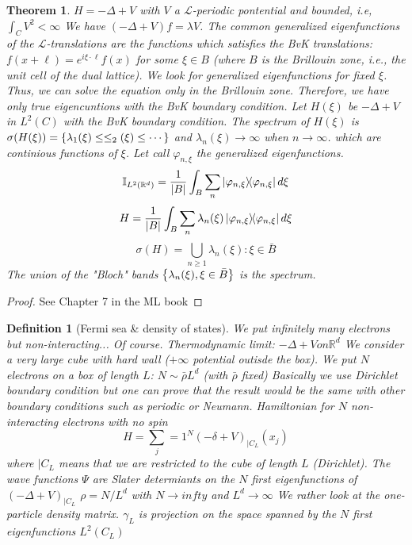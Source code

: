 \documentclass{article}
\newtheorem*{theorem}{Theorem}
\newtheorem*{definition}{Definition}
\newcommand{\RR}{\mathbb{R}}
\newcommand{\II}{\mathbb{I}}
\newcommand{\cL}{\mathcal{L}}
\newcommand{\sig}{\sigma}
\newcommand{\la}{\lambda}
\begin{document}
\begin{theorem} 
    $H = -\Delta +  V$ with $V$ a $\cL$-periodic pontential and bounded, i.e, $\int_C V^2 < \infty$
    We have $(-\Delta +  V) f = \la V$.
    The common generalized eigenfunctions of the $\cL$-translations are the functions which satisfies the BvK translations: 
    $f(x+\ell) = e^{i\xi\cdot\ell} f(x)$ for some $\xi \in B$ (where $B$ is the Brillouin zone, i.e., the unit cell of the dual lattice).
    We look for generalized eigenfunctions for fixed $\xi$.
    Thus, we can solve the equation only in the Brillouin zone.
    Therefore, we have only true eigencuntions with the BvK boundary condition.
    Let $H(\xi)$ be $-\Delta + V$ in $L^2(C)$ with the BvK boundary condition.
    The spectrum of $H(\xi)$ is 
    $\sig(H(\xi)) = \qty{ \la_1(\xi) \le \le_2(\xi) \le \cdots }$ and $\la_n(\xi) \to \infty$ when $n \to \infty$.
    which are continious functions of $\xi$.
    Let call $\varphi_{n,\xi}$ the generalized eigenfunctions.
    $$ \II_{L^2(\RR^d)} = \frac{1}{\abs{B}} \int_B \sum_n \dyad{\varphi_{n,\xi}} d\xi $$
    $$ H = \frac{1}{\abs{B}} \int_B \sum_n \la_n(\xi) \dyad{\varphi_{n,\xi}} d\xi $$
    $$ \sig(H) = \bigcup_{n \ge 1} { \la_n(\xi) \colon \xi \in \bar{B} } $$
    The union of the "Bloch" bands $\qty{ \la_n(\xi), \xi \in \bar{B} }$ is the spectrum.
\end{theorem}

\begin{proof} 
  See Chapter 7 in the ML book
\end{proof}

\begin{definition}[Fermi sea \& density of states]
  We put infinitely many electrons but non-interacting... Of course.
  Thermodynamic limit: 
  $-\Delta+V on \RR^d$
  We consider a very large cube with hard wall ($+\infty$ potential outisde the box).
  We put $N$ electrons on a box of length $L$: $N \sim \bar{\rho} L^d$ (with $\bar{\rho}$ fixed)
  Basically we use Dirichlet boundary condition but one can prove that the result would be the same with other boundary conditions such as periodic or Neumann.
  Hamiltonian for $N$ non-interacting electrons with no spin
  $$ H = \sum_j=1^N (-\delta + V)_{|C_L}(x_j) $$
  where $|C_L$ means that we are restricted to the cube of length $L$ (Dirichlet).
  The wave functions $\Psi$ are Slater determiants on the $N$ first eigenfunctions of $(-\Delta + V)_{|C_L}$
  $\rho = N/L^d$ with $N \to infty$ and $L^d \to \infty$
  We rather look at the one-particle density matrix.
  $\gamma_L$ is projection on the space spanned by the $N$ first eigenfunctions $L^2(C_L)$
\end{definition}
\end{document}

